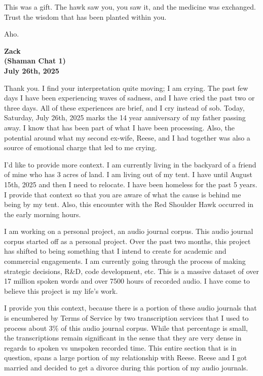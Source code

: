 \documentclass{article}
\begin{document}
This was a gift. The hawk saw you, you saw it, and the medicine was
exchanged. Trust the wisdom that has been planted within you.

Aho.

\begin{center}
\textbf{Zack} \\
\textbf{(Shaman Chat 1)} \\
\textbf{July 26th, 2025}
\end{center}

\medskip

Thank you. I find your interpretation quite moving; I am crying. The
past few days I have been experiencing waves of sadness, and I have
cried the past two or three days. All of these experiences are brief,
and I cry instead of sob. Today, Saturday, July 26th, 2025 marks the 14
year anniversary of my father passing away. I know that has been part of
what I have been processing. Also, the potential around what my second
ex-wife, Reese, and I had together was also a source of emotional charge
that led to me crying.

I'd like to provide more context. I am currently living in the backyard
of a friend of mine who has 3 acres of land. I am living out of my tent.
I have until August 15th, 2025 and then I need to relocate. I have been
homeless for the past 5 years. I provide that context so that you are
aware of what the cause is behind me being by my tent. Also, this
encounter with the Red Shoulder Hawk occurred in the early morning
hours.

I am working on a personal project, an audio journal corpus. This audio
journal corpus started off as a personal project. Over the past two
months, this project has shifted to being something that I intend to
create for academic and commercial engagements. I am currently going
through the process of making strategic decisions, R\&D, code
development, etc. This is a massive dataset of over 17 million spoken
words and over 7500 hours of recorded audio. I have come to believe this
project is my life's work.

I provide you this context, because there is a portion of these audio
journals that is encumbered by Terms of Service by two transcription
services that I used to process about 3\% of this audio journal corpus.
While that percentage is small, the transcriptions remain significant in
the sense that they are very dense in regards to spoken vs unspoken
recorded time. This entire section that is in question, spans a large
portion of my relationship with Reese. Reese and I got married and
decided to get a divorce during this portion of my audio journals.
\end{document}
